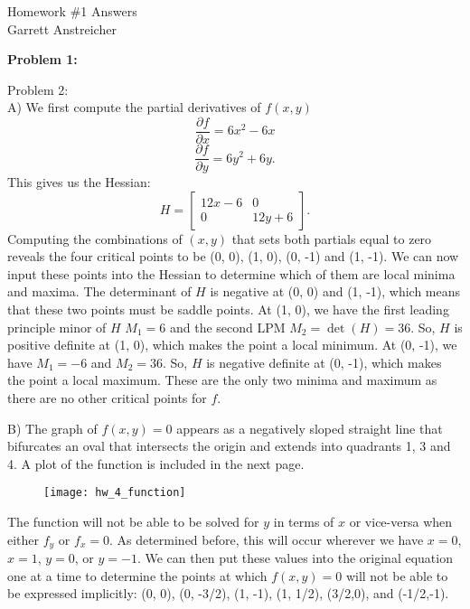 \documentclass[12pt,leqno]{article}
\begin{document}
\begin{center}
\Large{Homework {\#}1 Answers}\\
\large{Garrett Anstreicher}
\end{center}

\bigskip
\noindent \bf{Problem 1:}\\
\indent

\bigskip
\noindent Problem 2:\\
\indent A) We first compute the partial derivatives of $f(x, y)$
$$\frac{\partial f}{\partial x} = 6x^2 - 6x$$
$$\frac{\partial f}{\partial y} = 6y^2 + 6y.$$
This gives us the Hessian:
$$H = \begin{bmatrix}
12x-6 & 0 \\
0 & 12y + 6
\end{bmatrix}.$$
Computing the combinations of $(x, y)$ that sets both partials equal to zero reveals the four critical points to be (0, 0), (1, 0), (0, -1) and (1, -1). We can now input these points into the Hessian to determine which of them are local minima and maxima. The determinant of $H$ is negative at (0, 0) and (1, -1), which means that these two points must be saddle points. At (1, 0), we have the first leading principle minor of $H$ $M_1 = 6$ and the second LPM $M_2 = \det(H) = 36$. So, $H$ is positive definite at (1, 0), which makes the point a local minimum. At (0, -1), we have $M_1 = -6$ and $M_2 = 36$. So, $H$ is negative definite at (0, -1), which makes the point a local maximum. These are the only two minima and maximum as there are no other critical points for $f$. 

\indent B) The graph of $f(x,y) = 0$ appears as a negatively sloped straight line that bifurcates an oval that intersects the origin and extends into quadrants 1, 3 and 4. A plot of the function is included in the next page.
\begin{figure}
\texttt{[image: hw\_4\_function]}
\end{figure}
The function will not be able to be solved for $y$ in terms of $x$ or vice-versa when either $f_y$ or $f_x = 0$. As determined before, this will occur wherever we have $x = 0$, $x = 1$, $y = 0$, or $y = -1$. We can then put these values into the original equation one at a time to determine the points at which $f(x, y) = 0$ will not be able to be expressed implicitly: (0, 0), (0, -3/2), (1, -1), (1, 1/2), (3/2,0), and (-1/2,-1). 
\end{document}

